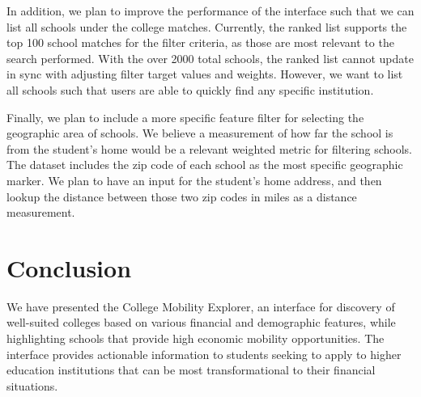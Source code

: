 \documentclass{vgtc}
\begin{document}
In addition, we plan to improve the performance of the interface such that we can list all schools under the college matches. Currently, the ranked list supports the top 100 school matches for the filter criteria, as those are most relevant to the search performed. With the over 2000 total schools, the ranked list cannot update in sync with adjusting filter target values and weights. However, we want to list all schools such that users are able to quickly find any specific institution.

Finally, we plan to include a more specific feature filter for selecting the geographic area of schools. We believe a measurement of how far the school is from the student’s home would be a relevant weighted metric for filtering schools. The dataset includes the zip code of each school as the most specific geographic marker. We plan to have an input for the student’s home address, and then lookup the distance between those two zip codes in miles as a distance measurement.

\section{Conclusion}
We have presented the College Mobility Explorer, an interface for discovery of well-suited colleges based on various financial and demographic features, while highlighting schools that provide high economic mobility opportunities. The interface provides actionable information to students seeking to apply to higher education institutions that can be most transformational to their financial situations. 




\end{document}
